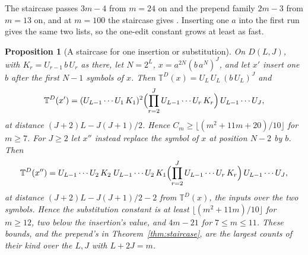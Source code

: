 \documentclass[11pt,a4paper]{article}
\theoremstyle{definition}
\theoremstyle{plain}
\newtheorem{proposition}{Proposition}
\newcommand{\T}{\mathbb{T}}
\begin{document}
The staircase passes \(3m - 4\) from \(m = 24\) on and the prepend family \(2m - 3\) from \(m = 13\) on, and at
\(m = 100\) the staircase gives \StaircaseHundred{}. Inserting one \(a\) into the first run gives the same two lists, so
the one-edit constant grows at least as fast.


\begin{proposition}[A staircase for one insertion or substitution]\label{prop:staircaseinsert}
On \(D(L, J)\), with \(K_r = U_{r-1}\,b\,U_r\) as there, let \(N = 2^L\), \(x = a^{2N}(b\,a^N)^J\), and let \(x'\)
insert one \(b\) after the first \(N - 1\) symbols of \(x\). Then \(\T^D(x) = U_L\,U_L\,(b\,U_L)^J\) and
\[ \T^D(x') = (U_{L-1} \cdots U_1\,K_1)^2 \Bigl(\prod_{r=2}^{J} U_{L-1} \cdots U_r\,K_r\Bigr)\, U_{L-1} \cdots U_J, \]
at distance \((J + 2)L - J(J + 1)/2\). Hence \(C_m \ge \lfloor (m^2 + 11m + 20)/10 \rfloor\) for \(m \ge 7\). For
\(J \ge 2\) let \(x''\) instead replace the symbol of \(x\) at position \(N - 2\) by \(b\). Then
\[ \T^D(x'') = U_{L-1} \cdots U_2\,K_2\; U_{L-1} \cdots U_2\,K_1 \Bigl(\prod_{r=2}^{J} U_{L-1} \cdots U_r\,K_r\Bigr)\,
  U_{L-1} \cdots U_J, \]
at distance \((J + 2)L - J(J + 1)/2 - 2\) from \(\T^D(x)\), the inputs over the two symbols. Hence the substitution
constant is at least \(\lfloor (m^2 + 11m)/10 \rfloor\) for \(m \ge 12\), two below the insertion's value, and
\(4m - 21\) for \(7 \le m \le 11\). These bounds, and the prepend's in Theorem~\ref{thm:staircase}, are the largest
counts of their kind over the \(L, J\) with \(L + 2J = m\).
\end{proposition}
\end{document}
